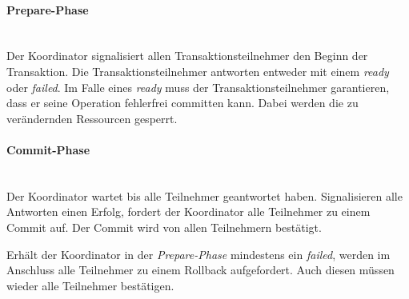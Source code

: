 \paragraph*{Prepare-Phase} \mbox{} \\
Der Koordinator signalisiert allen Transaktionsteilnehmer den Beginn der Transaktion. Die Transaktionsteilnehmer antworten entweder mit einem \textit{ready} oder \textit{failed}. Im Falle eines \textit{ready} muss der Transaktionsteilnehmer garantieren, dass er seine Operation fehlerfrei committen kann. Dabei werden die zu verändernden Ressourcen gesperrt. 

\paragraph*{Commit-Phase} \mbox{} \\
Der Koordinator wartet bis alle Teilnehmer geantwortet haben. Signalisieren alle Antworten einen Erfolg, fordert der Koordinator alle Teilnehmer zu einem Commit auf. Der Commit wird von allen Teilnehmern bestätigt.

Erhält der Koordinator in der \textit{Prepare-Phase} mindestens ein \textit{failed}, werden im Anschluss alle Teilnehmer zu einem Rollback aufgefordert. Auch diesen müssen wieder alle Teilnehmer bestätigen\cite{Gaitonde.24.03.2021}. 

